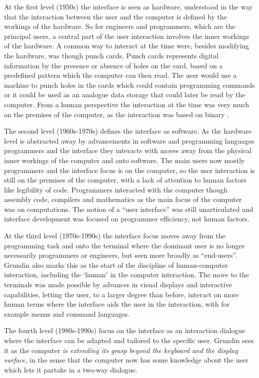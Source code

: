 At the first level (1950s) the interface is seen as hardware, understood in the way that the interaction between the user and the computer is defined by the workings of the hardware.
So for engineers and programmers, which are the principal users, a central part of the user interaction involves the inner workings of the hardware.
A common way to interact at the time were, besides modifying the hardware, was though punch cards.
Punch cards represents digital information by the presence or absence of holes on the card, based on a predefined pattern which the computer can then read.
The user would use a machine to punch holes in the cards which could contain programming commands or it could be used as an analogue data storage that could later be read by the computer.
From a human perspective the interaction at the time was very much on the premises of the computer, as the interaction was based on binary .

The second level (1960s-1970s) defines the interface as software.
As the hardware level is abstracted away by advancements in software and programming languages programmers and the interface they interacts with moves away from the physical inner workings of the computer and onto software.
The main users now mostly programmers and the interface focus is on the computer, so the user interaction is still on the premises of the computer, with a lack of attention to human factors like legibility of code.
Programmers interacted with the computer though assembly code, compilers and mathematics as the main focus of the computer was on computations. The notion of a ``user interface'' was still unarticulated and interface development was focused on programmer efficiency, not human factors.

At the third level (1970s-1990s) the interface focus moves away from the programming task and onto the terminal where the dominant user is no longer necessarily programmers or engineers, but seen more broadly as ``end-users''.
Grundin also marks this as the start of the discipline of human-computer interaction, including the `human' in the computer interaction.
The move to the terminals was made possible by advances in visual displays and interactive capabilities, letting the user, to a larger degree than before, interact on more human terms where the interface aids the user in the interaction, with for example menus and command languages.


The fourth level (1980s-1990s) focus on the interface as an interaction dialogue where the interface can be adapted and tailored to the specific user. 
Grundin sees it as the computer \emph{is extending its grasp beyond the keyboard and the display surface}, in the sense that the computer now has some knowledge about the user which lets it partake in a two-way dialogue.

